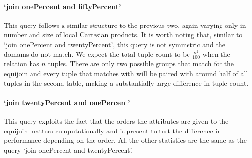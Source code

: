 \paragraph{`join onePercent and fiftyPercent'} This query follows a similar
structure to the previous two, again varying only in number and size of local
Cartesian products. It is worth noting that, similar to `join onePercent and
twentyPercent', this query is not symmetric and the domains do not match. We
expect the total tuple count to be $\frac{n^2}{100}$ when the
 relation has $n$ tuples. There are only two possible groups
that match for the equijoin and every tuple that matches with
 will be paired with around half of all tuples in
the second table, making a substantially large difference in tuple count.

\paragraph{`join twentyPercent and onePercent'} This query exploits the fact
that the orders the attributes are given to the equijoin matters computationally
and is present to test the difference in performance depending on the order. All
the other statistics are the same as the query `join onePercent and
twentyPercent'.
